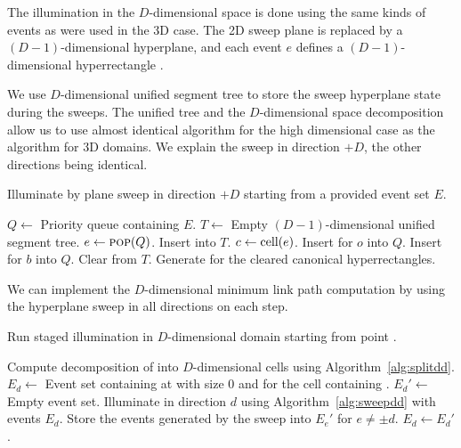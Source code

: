 \documentclass[english,gradu]{tktltiki2018}
\begin{document}
The illumination in the $D$-dimensional space is done using the same kinds of events as were used in the 3D case.
The 2D sweep plane is replaced by a $(D-1)$-dimensional hyperplane, and each event $e$ defines a $(D-1)$-dimensional hyperrectangle .

We use $D$-dimensional unified segment tree to store the sweep hyperplane state during the sweeps.
The unified tree and the $D$-dimensional space decomposition allow us to use almost identical algorithm for the high dimensional case as the algorithm for 3D domains.
We explain the sweep in direction $+D$, the other directions being identical.

\begin{alg}\label{alg:sweepdd}
Illuminate by plane sweep in direction $+D$ starting from a provided event set $E$.
\begin{algorithmic}
\State $Q\gets$ Priority queue containing $E$.
\State $T\gets$ Empty $(D-1)$-dimensional unified segment tree.
	\State $e\gets\textsc{pop}(Q)$.
		\State Insert  into $T$.
			\State $c\gets\text{cell}(e)$.
				\State Insert \obsE for $o$ into $Q$.
			\EndFor
				\State Insert \cellE for $b$ into $Q$.
			\EndFor
		\EndIf
		\State Clear  from $T$.
		\State Generate \addEs for the cleared canonical hyperrectangles.
	\EndIf
\EndWhile
\end{algorithmic}
\end{alg}

We can implement the $D$-dimensional minimum link path computation by using the hyperplane sweep in all directions on each step.

\begin{alg}\label{alg:minlinkdd}
Run staged illumination in $D$-dimensional domain \fspace starting from point \spt.
\begin{algorithmic}
\State Compute decomposition of \fspace into $D$-dimensional cells using Algorithm~\ref{alg:splitdd}.
	\State $E_d\gets$ Event set containing \addE at \spt with size 0 and \cellE for the cell containing \spt.
\EndFor
{}
		\State $E_d'\gets$ Empty event set.
	\EndFor
		\State Illuminate in direction $d$ using Algorithm~\ref{alg:sweepdd} with events $E_d$.
		\State Store the events generated by the sweep into $E_e'$ for $e\neq\pm d$.
	\EndFor
		\State $E_d\gets E_d'$.
	\EndFor
\EndWhile
\end{algorithmic}
\end{alg}
\end{document}
